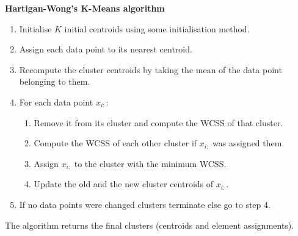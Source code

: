\documentclass[12pt]{article}
\begin{document}
\begin{center}
	\begin{tcolorbox}[breakable,colback=white!100!white,colframe=black!100!black]
		\noindent\textbf{Hartigan-Wong's K-Means algorithm}
		\begin{enumerate}
			\item Initialise $K$ initial centroids using some initialisation method. 
			
			\item Assign each data point to its nearest centroid. 
			
			\item Recompute the cluster centroids by taking the mean of the data point belonging to them.
			
			\item For each data point $x_{i:}$:
			
			\begin{enumerate}
				\item Remove it from its cluster and compute the WCSS of that cluster.
				\item Compute the WCSS of each other cluster if $x_{i:}$ was assigned them.
				\item Assign $x_{i:}$ to the cluster with the minimum WCSS.
				\item Update the old and the new cluster centroids of $x_{i:}$.
			\end{enumerate}
			
			\item If no data points were changed clusters terminate else go to step 4.
			
		\end{enumerate}	
		The algorithm returns the final clusters (centroids and element assignments).
	\end{tcolorbox}
\end{center}

\cleardoublepage
\end{document}
